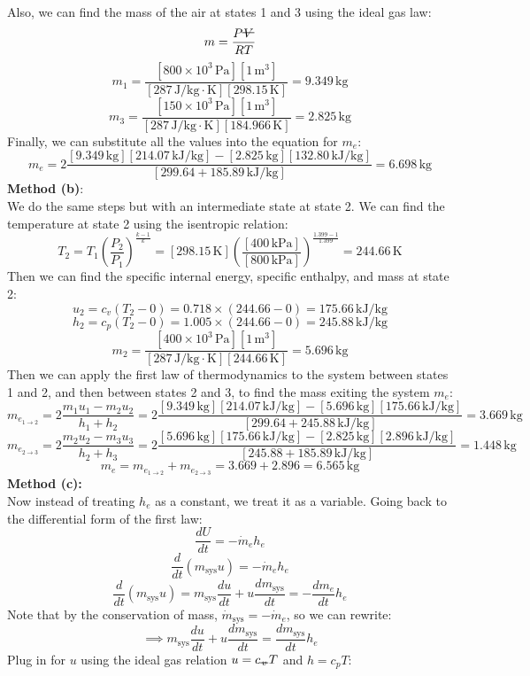 \documentclass[12pt]{article}
\newcommand{\vol}{\mathord{\text{\ooalign{\hidewidth $V$\hidewidth\cr\kern-0.5pt\raisebox{0.8ex}{\rule[0pt]{1em}{0.5pt}}}}}}
\newcommand{\svol}{%
  \mathord{\text{\ooalign{%
    \hfil$v$\hfil\cr
    \hfil\rule[0.6ex]{0.8em}{0.5pt}\hfil
  }}}%
}
\begin{document}
Also, we can find the mass of the air at states 1 and 3 using the ideal gas law:
\[m = \frac{P\vol}{RT}\]
\[m_1 = \frac{[800\times10^3\,\text{Pa}][1\,\text{m}^3]}{[287 \,\text{J/kg}\cdot\text{K}][298.15\,\text{K}]} = 9.349\,\text{kg}\]
\[m_3 = \frac{[150\times10^3\,\text{Pa}][1\,\text{m}^3]}{[287 \,\text{J/kg}\cdot\text{K}][184.966\,\text{K}]} = 2.825\,\text{kg}\]
Finally, we can substitute all the values into the equation for $m_e$:
\[m_e = 2\frac{[9.349\,\text{kg}][214.07\,\text{kJ/kg}] - [2.825\,\text{kg}][132.80\,\text{kJ/kg}]}{[299.64 + 185.89\,\text{kJ/kg}]} = \boxed{6.698\,\text{kg}}\]
\textbf{Method (b)}:\\
We do the same steps but with an intermediate state at state 2. We can find the temperature at state 2 using the isentropic relation:
\[T_2 = T_1 \left(\frac{P_2}{P_1}\right)^{\frac{k-1}{k}} = [298.15\,\text{K}] \left(\frac{[400\,\text{kPa}]}{[800\,\text{kPa}]}\right)^{\frac{1.399-1}{1.399}}= 244.66\,\text{K}\]
Then we can find the specific internal energy, specific enthalpy, and mass at state 2:
\[u_2 = c_v (T_2 - 0) = 0.718 \times (244.66 - 0) = 175.66\,\text{kJ/kg}\]
\[h_2 = c_p (T_2 - 0) = 1.005 \times (244.66 - 0) = 245.88\,\text{kJ/kg}\]
\[m_2 = \frac{[400\times10^3\,\text{Pa}][1\,\text{m}^3]}{[287 \,\text{J/kg}\cdot\text{K}][244.66\,\text{K}]} = 5.696\,\text{kg}\]
Then we can apply the first law of thermodynamics to the system between states 1 and 2, and then between states 2 and 3, to find the mass exiting the system $m_e$:
\[m_{e_{1\to2}} = 2 \frac{m_1u_1-m_2u_2}{h_1+h_2} = 2 \frac{[9.349\,\text{kg}][214.07\,\text{kJ/kg}] - [5.696\,\text{kg}][175.66\,\text{kJ/kg}]}{[299.64 + 245.88\,\text{kJ/kg}]} = 3.669\,\text{kg}\]
\[m_{e_{2\to3}} = 2 \frac{m_2u_2-m_3u_3}{h_2+h_3} = 2 \frac{[5.696\,\text{kg}][175.66\,\text{kJ/kg}] - [2.825\,\text{kg}][2.896\,\text{kJ/kg}]}{[245.88 + 185.89\,\text{kJ/kg}]} = 1.448\,\text{kg}\]
\[m_e = m_{e_{1\to2}} + m_{e_{2\to3}} = 3.669 + 2.896 = \boxed{6.565\,\text{kg}}\]
\textbf{Method (c):}\\
Now instead of treating $h_e$ as a constant, we treat it as a variable. Going back to the differential form of the first law:
\[\frac{dU}{dt} = -\dot{m}_eh_e\]
\[\frac{d}{dt}(m_\text{sys} u) = -\dot{m}_eh_e\]
\[\frac{d}{dt}(m_\text{sys} u) = m_\text{sys} \frac{du}{dt} + u \frac{dm_\text{sys}}{dt} = -\frac{dm_e}{dt}h_e\]
Note that by the conservation of mass, $\dot{m}_\text{sys} = -\dot{m}_e$, so we can rewrite:
\[\implies m_\text{sys} \frac{du}{dt} + u \frac{dm_\text{sys}}{dt} = \frac{dm_\text{sys}}{dt}h_e\]
Plug in for $u$ using the ideal gas relation $u = c_{\svol} T$ and $h = c_p T$:
\end{document}
